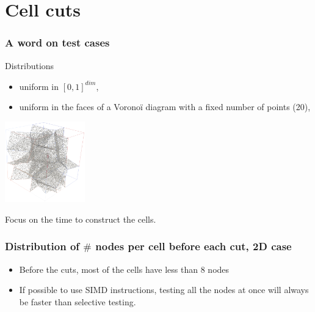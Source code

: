 \documentclass[aspectratio=169]{beamer}
\begin{document}
\section{Cell cuts}

\begin{frame}
    \frametitle{A word on test cases}

    Distributions
    \begin{itemize}
        \item uniform in $[0,1]^{dim}$,
        \item uniform in the faces of a Voronoï diagram with a fixed number of points (20),
    \end{itemize}

    \begin{center}
        
        \kern 1cm
        \includegraphics[width=0.26\textwidth]{img/voro_distrib_3d.png}
    \end{center}


    \vfill
    Focus on the time to construct the cells.
\end{frame}

\begin{frame}
    \frametitle{Distribution of $\#$ nodes per cell before each cut, 2D case}

    \begin{minipage}[c][0.6\textheight][c]{0.4\textwidth}
        
    \end{minipage}
    \textwidth
    \begin{minipage}{0.55\textwidth}
        \begin{itemize}
            \item Before the cuts, most of the cells have less than 8 nodes
            
            \bigskip
            \item If possible to use SIMD instructions, testing all the nodes at once will
                  always be faster than selective testing. 
        \end{itemize}
    \end{minipage}
\end{frame}
\end{document}
